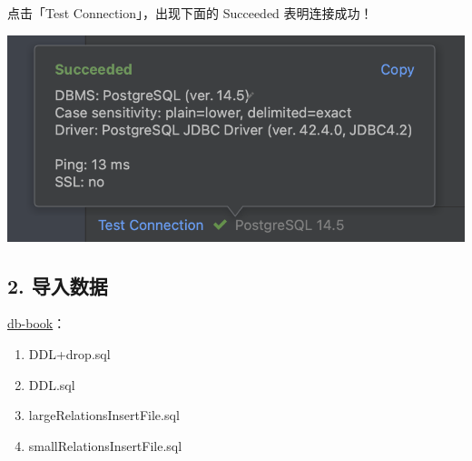 \documentclass[aspectratio=169, 14pt]{beamer}
\begin{document}
\begin{frame}
	点击「Test Connection」，出现下面的 \alert{Succeeded} 表明连接成功！

	\includegraphics[width=.8\textwidth]{week4/connection}

\end{frame}

\begin{frame}[fragile]

	\section{\textcolor{darkmidnightblue}{2. 导入数据}}
	\href{https://github.com/ChenZhongPu/db-swufe/tree/master/db-book}{db-book}：
	\begin{enumerate}
		\item DDL+drop.sql
		\item DDL.sql
		\item largeRelationsInsertFile.sql
		\item smallRelationsInsertFile.sql
	\end{enumerate}
\end{frame}
\end{document}
